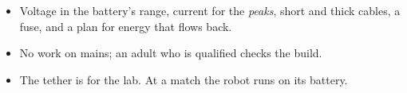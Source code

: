\begin{keyidea}
\begin{itemize}[nosep]
  \item Voltage in the battery's range, current for the \emph{peaks}, short and thick cables, a fuse, and a plan for energy that flows back.
  \item No work on mains; an adult who is qualified checks the build.
  \item The tether is for the lab. At a match the robot runs on its battery.
\end{itemize}
\end{keyidea}
